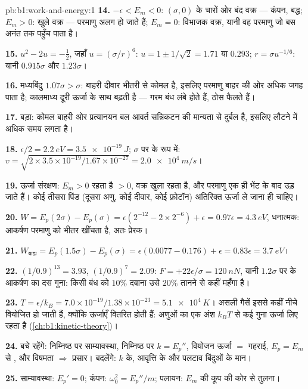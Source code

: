 \begin{solution}{pb:b1:work-and-energy:1}
\textbf{14.} $-\epsilon < E_m < 0$: $(\sigma, 0)$ के चारों ओर बंद वक्र ---
कंपन, बद्ध; $E_m > 0$: खुले वक्र --- परमाणु अलग हो जाते हैं;
$E_m = 0$: विभाजक वक्र, यानी वह परमाणु जो बस अनंत तक पहुँच पाता है।

\textbf{15.} $u^2 - 2u = -\tfrac12$, जहाँ $u = (\sigma/r)^6$: $u = 1 \pm 1/\sqrt2
= 1.71$ या $0.293$; $r = \sigma u^{-1/6}$: यानी $0.915\sigma$ और $1.23\sigma$।

\textbf{16.} मध्यबिंदु $1.07\sigma > \sigma$: बाहरी दीवार भीतरी से कोमल है,
इसलिए परमाणु बाहर की ओर अधिक जगह पाता है; कालमाध्य दूरी ऊर्जा के साथ बढ़ती
है --- गरम बंध लंबे होते हैं, ठोस फैलते हैं।

\textbf{17.} बड़ा: कोमल बाहरी ओर प्रत्यानयन बल आवर्त सन्निकटन की मान्यता से
दुर्बल है, इसलिए लौटने में अधिक समय लगता है।

\textbf{18.} $\epsilon/2 = \qty{2.2}{eV} = \qty{3.5e-19}{J}$; $\sigma$ पर
 के रूप में: $v = \sqrt{2 \times 3.5\times10^{-19}/1.67\times10^{-27}}
= \qty{2.0e4}{m/s}$।

\textbf{19.} ऊर्जा संरक्षण: $E_m > 0$ रहता है $> 0$, वक्र खुला रहता है,
और परमाणु एक ही भेंट के बाद उड़ जाते हैं। कोई तीसरा पिंड (दूसरा अणु, कोई
दीवार, कोई फ़ोटॉन) अतिरिक्त ऊर्जा ले जाना ही चाहिए।

\textbf{20.} $W = E_p(2\sigma) - E_p(\sigma) = \epsilon(2^{-12} - 2 \times 2^{-6})
+ \epsilon = 0.97\epsilon = \qty{4.3}{eV}$, धनात्मक: आकर्षण परमाणु को भीतर
खींचता है, अतः प्रेरक।

\textbf{21.} $W_{\text{बाह्य}} = E_p(1.5\sigma) - E_p(\sigma) = \epsilon(0.0077 -
0.176) + \epsilon = 0.83\epsilon = \qty{3.7}{eV}$।

\textbf{22.} $(1/0.9)^{13} = 3.93$, $(1/0.9)^7 = 2.09$: $F = +22\epsilon/\sigma
= \qty{+120}{nN}$, यानी $1.2\sigma$ पर के आकर्षण का दस गुना: किसी बंध को
$10\%$ दबाना उसे $20\%$ तानने से कहीं महँगा है।

\textbf{23.} $T = \epsilon/k_B = 7.0\times10^{-19}/1.38\times10^{-23} =
\qty{5.1e4}{K}$। असली गैसें इससे कहीं नीचे वियोजित हो जाती हैं, क्योंकि
ऊर्जाएँ वितरित होती हैं: अणुओं का एक अंश $k_BT$ से कई गुना ऊर्जा लिए रहता
है (\cref{ch:b1:kinetic-theory})।

\textbf{24.} बचे रहेंगे: निम्निष्ठ पर साम्यावस्था, निम्निष्ठ पर
$k = E_p''$, वियोजन ऊर्जा $=$ गहराई, $E_p = E_m$ से , और विषमता
$\Rightarrow$ प्रसार। बदलेंगे: $k$ के, आवृत्ति के और पलटाव बिंदुओं के मान।

\textbf{25.} साम्यावस्था: $E_p' = 0$; कंपन: $\omega_0^2 = E_p''/m$;
पलायन: $E_m$ की कूप की कोर से तुलना।
\end{solution}
